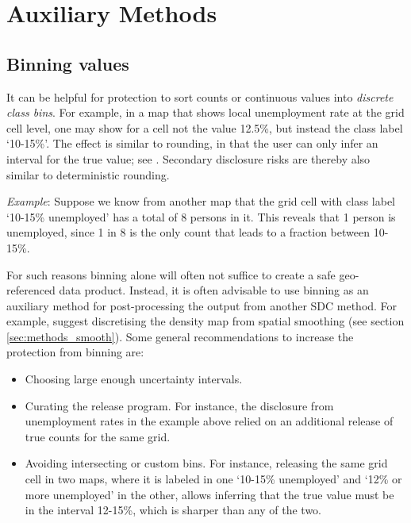 \section{Auxiliary Methods} \label{sec:aux}

\subsection{Binning values} \label{sec:aux_bin}

It can be helpful for protection to sort counts or continuous values into \emph{discrete class bins}. For example, in a map that shows local unemployment rate at the grid cell level, one may show for a cell not the value 12.5\%, but instead the class label `10-15\%'. The effect is similar to rounding, in that the user can only infer an interval for the true value; see \citet[5.5]{HundepoolEtAl2024}. Secondary disclosure risks are thereby also similar to deterministic rounding. 

\begin{tcolorbox}[breakable]
\emph{Example}:
Suppose we know from another map that the grid cell with class label `10-15\% unemployed' has a total of 8 persons in it. This reveals that 1 person is unemployed, since 1 in 8 is the only count that leads to a fraction between 10-15\%.
\end{tcolorbox}

For such reasons binning alone will often not suffice to create a safe geo-referenced data product. Instead, it is often advisable to use binning as an auxiliary method for post-processing the output from another SDC method. For example, \citet{JongeWolf2016} suggest discretising the density map from spatial smoothing (see section \ref{sec:methods_smooth}). Some general recommendations to increase the protection from binning are:
\begin{itemize}
    \item Choosing large enough uncertainty intervals.
    \item Curating the release program. For instance, the disclosure from unemployment rates in the example above relied on an additional release of true counts for the same grid.
    \item Avoiding intersecting or custom bins. For instance, releasing the same grid cell in two maps, where it is labeled in one `10-15\% unemployed' and `12\% or more unemployed' in the other, allows inferring that the true value must be in the interval 12-15\%, which is sharper than any of the two.
\end{itemize}

